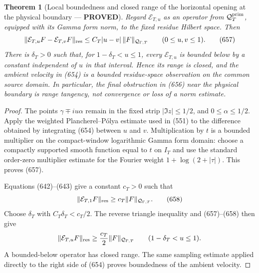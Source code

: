 \documentclass[11pt]{article}
\newtheorem{theorem}{Theorem}
\newcommand{\PROVED}{\textcolor{green!45!black}{\textbf{PROVED}}}
\begin{document}
\begin{theorem}[Local boundedness and closed range of the horizontal
opening at the physical boundary --- \PROVED]
Regard \(\mathcal E_{T,u}\) as an operator from
\(\mathcal Q_T^{\rm prim}\), equipped with its Gamma form norm, to the
fixed residue Hilbert space.  Then
\begin{equation}
 \|\mathcal E_{T,u}F-\mathcal E_{T,v}F\|_{\rm res}
 \le C_T|u-v|\,\|F\|_{\mathcal Q_{\Gamma,T}}
 \qquad(0\le u,v\le1).                              \tag{657}
\end{equation}
There is \(\delta_T>0\) such that, for
\(1-\delta_T<u\le1\), every \(\mathcal E_{T,u}\) is bounded below by a
constant independent of \(u\) in that interval.  Hence its range is closed,
and the ambient velocity in (654) is a bounded residue-space observation on
the common source domain.  In particular, the final obstruction in (656)
near the physical boundary is range tangency, not convergence or loss of a
norm estimate.
\end{theorem}

\begin{proof}
The points \(\gamma\mp iu\alpha\) remain in the fixed strip
\(|\Im z|\le1/2\), and \(0\le\alpha\le1/2\).  Apply the weighted
Plancherel--P\'olya estimate used in (551) to the difference obtained by
integrating (654) between \(u\) and \(v\).  Multiplication by \(t\) is a
bounded multiplier on the compact-window logarithmic Gamma form domain:
choose a compactly supported smooth function equal to \(t\) on \(I_T\) and
use the standard order-zero multiplier estimate for the Fourier weight
\(1+\log(2+|\tau|)\).  This proves (657).

Equations (642)--(643) give a constant \(c_T>0\) such that
\begin{equation}
 \|\mathcal E_{T,1}F\|_{\rm res}
 \ge c_T\|F\|_{\mathcal Q_{\Gamma,T}}.              \tag{658}
\end{equation}
Choose \(\delta_T\) with \(C_T\delta_T<c_T/2\).  The reverse triangle
inequality and (657)--(658) then give
\[
 \|\mathcal E_{T,u}F\|_{\rm res}
 \ge\frac{c_T}{2}\|F\|_{\mathcal Q_{\Gamma,T}}
 \qquad(1-\delta_T<u\le1).
\]
A bounded-below operator has closed range.  The same sampling estimate
applied directly to the right side of (654) proves boundedness of the
ambient velocity.
\end{proof}
\end{document}
